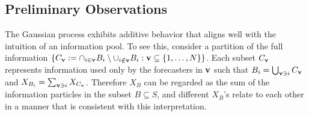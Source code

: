 \documentclass[12pt]{article}
\theoremstyle{definition}
\theoremstyle{definition}
\def\v{{\bf v}}
\begin{document}
\subsection{Preliminary Observations}
\label{prelim}
 The Gaussian process exhibits additive behavior that aligns well with the intuition of an information pool. To see this, consider a partition of the full information $\{ C_\v := \cap_{i \in \v} B_i \setminus \cup_{i \notin \v} B_i : \v \subseteq \{1, \dots, N\}\}$. Each subset $C_\v$ represents information used only by the forecasters in $\v$ such that $B_i = \bigcup_{\v \ni i} C_\v$ and $X_{B_i} = \sum_{\v \ni i} X_{C_\v}$. Therefore $X_{B}$ can be regarded as the sum of the information particles in the subset $B \subseteq S$, and different $X_{B}$'s relate to each other in a manner that is consistent with this interpretation. 
\end{document}
